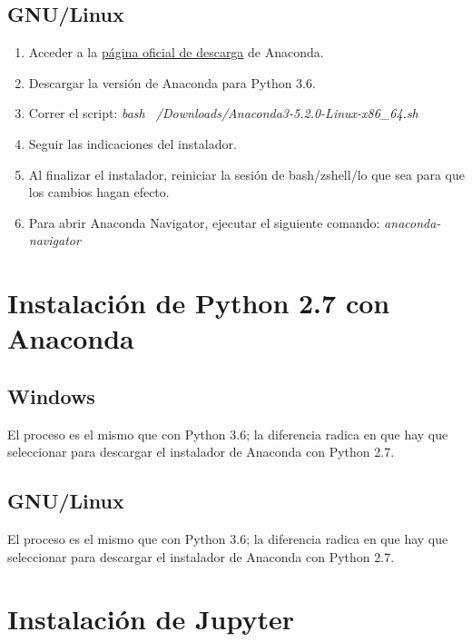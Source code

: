 \documentclass{article}
\begin{document}
        \subsection{GNU/Linux}
            \begin{enumerate}
                \item Acceder a la \href{https://www.anaconda.com/download/}{p\'{a}gina oficial de descarga} de 
                    Anaconda.
                \item Descargar la versi\'{o}n de Anaconda para Python 3.6.

                \item Correr el script: \textit{bash ~/Downloads/Anaconda3-5.2.0-Linux-x86\_64.sh}

                \item Seguir las indicaciones del instalador.

                \item Al finalizar el instalador, reiniciar la sesi\'{o}n de bash/zshell/lo que sea para
                que los cambios hagan efecto.

                \item Para abrir Anaconda Navigator, ejecutar el siguiente comando: \textit{anaconda-navigator}
            \end{enumerate}
            \newpage
    \section{Instalaci\'{o}n de Python 2.7 con Anaconda}
        \subsection{Windows}
        
        El proceso es el mismo que con Python 3.6; la diferencia radica en que hay que seleccionar para descargar
        el instalador de Anaconda con Python 2.7.
        \subsection{GNU/Linux}
        El proceso es el mismo que con Python 3.6; la diferencia radica en que hay que seleccionar para descargar
        el instalador de Anaconda con Python 2.7.

    \section{Instalaci\'{o}n de Jupyter}
\end{document}
